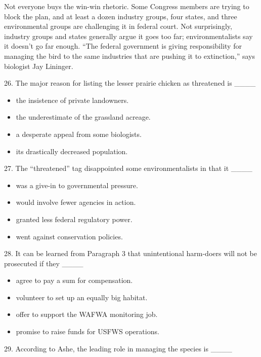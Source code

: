 \documentclass[UTF8,11pt]{ctexart}
\begin{document}
Not everyone buys the win-win rhetoric. Some Congress members are trying to block the plan, and at least a dozen industry groups, four states, and three environmental groups are challenging it in federal court. Not surprisingly, industry groups and states generally argue it goes too far; environmentalists say it doesn’t go far enough. “The federal government is giving responsibility for managing the bird to the same industries that are pushing it to extinction,” says biologist Jay Lininger.


26. The major reason for listing the lesser prairie chicken as threatened is \_\_\_\_


\begin{itemize}[leftmargin=2em,itemsep=.2em,topsep=.4em]\item[A.] the insistence of private landowners.
\item[B.] the underestimate of the grassland acreage.
\item[C.] a desperate appeal from some biologists.
\item[D.] its drastically decreased population.
\end{itemize}

27. The “threatened” tag disappointed some environmentalists in that it \_\_\_\_


\begin{itemize}[leftmargin=2em,itemsep=.2em,topsep=.4em]\item[A.] was a give-in to governmental pressure.
\item[B.] would involve fewer agencies in action.
\item[C.] granted less federal regulatory power.
\item[D.] went against conservation policies.
\end{itemize}

28. It can be learned from Paragraph 3 that unintentional harm-doers will not be prosecuted if they \_\_\_\_


\begin{itemize}[leftmargin=2em,itemsep=.2em,topsep=.4em]\item[A.] agree to pay a sum for compensation.
\item[B.] volunteer to set up an equally big habitat.
\item[C.] offer to support the WAFWA monitoring job.
\item[D.] promise to raise funds for USFWS operations.
\end{itemize}

29. According to Ashe, the leading role in managing the species is \_\_\_\_
\end{document}
